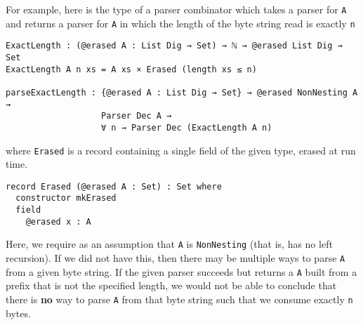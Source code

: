 \documentclass[11pt]{article}
\begin{document}
For example, here is the type of a parser combinator which takes a parser for
\texttt{A} and returns a parser for \texttt{A} in which the length of the byte string read
is exactly \texttt{n}

\begin{verbatim}
ExactLength : (@erased A : List Dig → Set) → ℕ → @erased List Dig → Set
ExactLength A n xs = A xs × Erased (length xs ≤ n)

parseExactLength : {@erased A : List Dig → Set} → @erased NonNesting A →
                   Parser Dec A →
                   ∀ n → Parser Dec (ExactLength A n)
\end{verbatim}

where \texttt{Erased} is a record containing a single field of the given type,
erased at run time.
\begin{verbatim}
record Erased (@erased A : Set) : Set where
  constructor mkErased
  field
    @erased x : A
\end{verbatim}

Here, we require as an assumption that \texttt{A} is \texttt{NonNesting} (that is, has no
left recursion).
If we did not have this, then there may be multiple ways to parse \texttt{A} from a
given byte string.
If the given parser succeeds but returns a \texttt{A} built from a prefix that is
not the specified length, we would not be able to conclude that there is \textbf{no}
way to parse \texttt{A} from that byte string such that we consume exactly \texttt{n} bytes.
\end{document}
